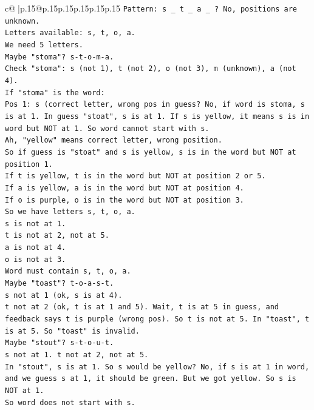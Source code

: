 \documentclass{article}
\begin{document}
{\begin{supertabular}{c@{$\;$}|p{.15\linewidth}@{}p{.15\linewidth}p{.15\linewidth}p{.15\linewidth}p{.15\linewidth}p{.15\linewidth}}
{{{\texttt{Pattern: s \_ t \_ a \_ ? No, positions are unknown.} \\
\texttt{Letters available: s, t, o, a.} \\
\texttt{We need 5 letters.} \\
\texttt{Maybe "stoma"? s{-}t{-}o{-}m{-}a.} \\
\texttt{Check "stoma": s (not 1), t (not 2), o (not 3), m (unknown), a (not 4).} \\
\texttt{If "stoma" is the word:} \\
\texttt{Pos 1: s (correct letter, wrong pos in guess? No, if word is stoma, s is at 1. In guess "stoat", s is at 1. If s is yellow, it means s is in word but NOT at 1. So word cannot start with s.} \\
\texttt{Ah, "yellow" means correct letter, wrong position.} \\
\texttt{So if guess is "stoat" and s is yellow, s is in the word but NOT at position 1.} \\
\texttt{If t is yellow, t is in the word but NOT at position 2 or 5.} \\
\texttt{If a is yellow, a is in the word but NOT at position 4.} \\
\texttt{If o is purple, o is in the word but NOT at position 3.} \\
\texttt{So we have letters s, t, o, a.} \\
\texttt{s is not at 1.} \\
\texttt{t is not at 2, not at 5.} \\
\texttt{a is not at 4.} \\
\texttt{o is not at 3.} \\
\texttt{Word must contain s, t, o, a.} \\
\texttt{Maybe "toast"? t{-}o{-}a{-}s{-}t.} \\
\texttt{s not at 1 (ok, s is at 4).} \\
\texttt{t not at 2 (ok, t is at 1 and 5). Wait, t is at 5 in guess, and feedback says t is purple (wrong pos). So t is not at 5. In "toast", t is at 5. So "toast" is invalid.} \\
\texttt{Maybe "stout"? s{-}t{-}o{-}u{-}t.} \\
\texttt{s not at 1. t not at 2, not at 5.} \\
\texttt{In "stout", s is at 1. So s would be yellow? No, if s is at 1 in word, and we guess s at 1, it should be green. But we got yellow. So s is NOT at 1.} \\
\texttt{So word does not start with s.} \\
}}}
\end{supertabular}}
\end{document}
